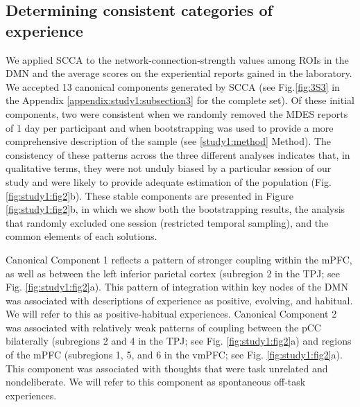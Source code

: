 \subsection{Determining consistent categories of experience}
\label{study1:results:a}
We applied SCCA to the network-connection-strength values among ROIs in the DMN and the average scores on the experiential reports gained in the laboratory. We accepted 13 canonical components generated by SCCA (see Fig.\ref{fig:3S3} in the Appendix \ref{appendix:study1:subsection3} for the complete set). Of these initial components, two were consistent when we randomly removed the MDES reports of 1 day per participant and when bootstrapping was used to provide a more comprehensive description of the sample (see \ref{study1:method} Method). The consistency of these patterns across the three different analyses indicates that, in qualitative terms, they were not unduly biased by a particular session of our study and were likely to provide adequate estimation of the population (Fig. \ref{fig:study1:fig2}b). These stable components are presented in Figure \ref{fig:study1:fig2}b, in which we show both the bootstrapping results, the analysis that randomly excluded one session (restricted temporal sampling), and the common elements of each solutions.

Canonical Component 1 reflects a pattern of stronger coupling within the mPFC, as well as between the left inferior parietal cortex (subregion 2 in the TPJ; see Fig. \ref{fig:study1:fig2}a). This pattern of integration within key nodes of the DMN was associated with descriptions of experience as positive, evolving, and habitual. We will refer to this as positive-habitual experiences. Canonical Component 2 was associated with relatively weak patterns of coupling between the pCC bilaterally (subregions 2 and 4 in the TPJ; see Fig. \ref{fig:study1:fig2}a) and regions of the mPFC (subregions 1, 5, and 6 in the vmPFC; see Fig. \ref{fig:study1:fig2}a). This component was associated with thoughts that were task unrelated and nondeliberate. We will refer to this component as spontaneous off-task experiences.

